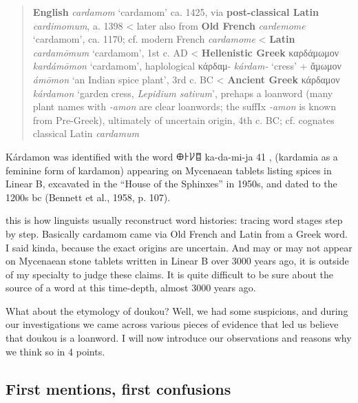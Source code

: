 \documentclass[12pt]{article}
\begin{document}
\begin{quote}
    \textbf{English} \textit{cardamom} `cardamom' ca. 1425, via \textbf{post-classical Latin} \textit{cardimomum}, a. 1398
    < later also from \textbf{Old French} \textit{cardemome} `cardamom', ca. 1170; cf. modern French \textit{cardamome}
    < \textbf{Latin} \textit{cardamōmum} `cardamom', 1st c. AD
    < \textbf{Hellenistic Greek} {καρδάμωμον} \textit{kardámōmon} `cardamom', haplological κάρδαμ- \textit{kárdam-} `cress' + ἄμωμον \textit{ámōmon} `an Indian spice plant', 3rd c. BC
    < \textbf{Ancient Greek} {κάρδαμον} \textit{kárdamon} `garden cress, \textit{Lepidium sativum}', prehaps a loanword (many plant names with \textit{-amon} are clear loanwords; the suffIx \textit{-amon} is known from Pre-Greek), ultimately of uncertain origin, 4th c. BC; cf. cognates classical Latin \textit{cardamum}
    \parencites[s.v. cardamom]{oed}[s.v. cardamome]{tlfi}[s.v. cardamomum]{lewis_1879_latin}[s.v. καρδάμωμον]{liddell_1940_greekenglish}[s.v. κάρδαμον]{liddell_1940_greekenglish}[644]{beekes_2010_etymological}
\end{quote}

Kárdamon was identified with the word 𐀏𐀅𐀖𐀊 ka-da-mi-ja 41 , (kardamia as a feminine form of kardamon) appearing on Mycenaean tablets listing spices in Linear B, excavated in the “House of the Sphinxes” in 1950s, and dated to the 1200s bc (Bennett et al., 1958, p. 107).



this is how linguists usually reconstruct word histories: tracing word stages step by step. Basically cardamom came via Old French and Latin from a Greek word. I said kinda, because the exact origins are uncertain. And may or may not appear on Mycenaean stone tablets written in Linear B over 3000 years ago, it is outside of my specialty to judge these claims. It is quite difficult to be sure about the source of a word at this time-depth, almost 3000 years ago.

What about the etymology of doukou? Well, we had some suspicions, and during our investigations we came across various pieces of evidence that led us believe that doukou is a loanword. I will now introduce our observations and reasons why we think so in 4 points.

\subsection{First mentions, first confusions}
\end{document}
